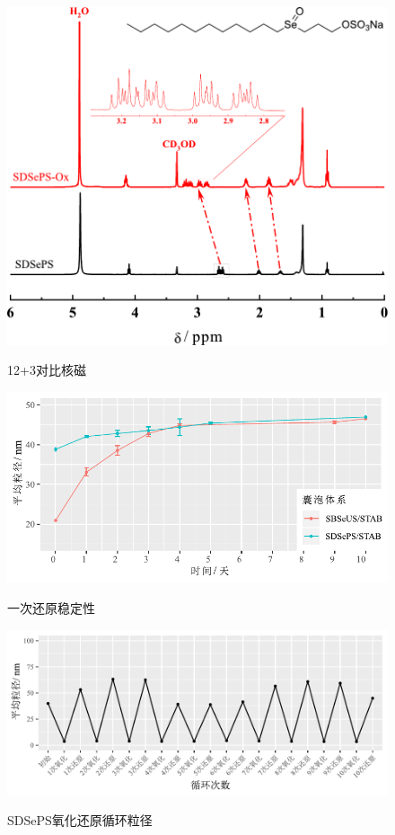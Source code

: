 \documentclass[bachelor,fandolfonts,replaceperiod]{jnuthesis}
\begin{document}
    \begin{figure}[htbp]
        \centering
        \includegraphics[width=.4\textwidth]{figure/SDSePS-nmr-diff.pdf}\\
        \caption{12+3对比核磁}\label{fig:SDSePs-nmr-diff}
    \end{figure}
    
    \begin{figure}[htbp]
        \centering
        \includegraphics[width=.76\textwidth]{figure/vesicle-Re-stability.pdf}\\
        \caption{一次还原稳定性}\label{fig:vesicle-Re-stability}
    \end{figure}

    \begin{figure}[htbp]
        \centering
        \includegraphics[width=.8\textwidth]{figure/SDSePS-redox-circle.pdf}\\
        \caption{SDSePS氧化还原循环粒径}\label{fig:SDSePS-redox-circle}
    \end{figure}
    
\end{document}
